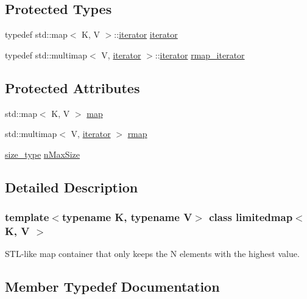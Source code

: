 \subsection*{Protected Types}
\begin{DoxyCompactItemize}
\item 
typedef std\+::map$<$ K, V $>$\+::\mbox{\hyperlink{classlimitedmap_aea661213ab6f699e9667bea25bf99821}{iterator}} \mbox{\hyperlink{classlimitedmap_aea661213ab6f699e9667bea25bf99821}{iterator}}
\item 
typedef std\+::multimap$<$ V, \mbox{\hyperlink{classlimitedmap_aea661213ab6f699e9667bea25bf99821}{iterator}} $>$\+::\mbox{\hyperlink{classlimitedmap_aea661213ab6f699e9667bea25bf99821}{iterator}} \mbox{\hyperlink{classlimitedmap_ad3d926b1f365d819073ddaed8daa4400}{rmap\+\_\+iterator}}
\end{DoxyCompactItemize}
\subsection*{Protected Attributes}
\begin{DoxyCompactItemize}
\item 
std\+::map$<$ K, V $>$ \mbox{\hyperlink{classlimitedmap_a66e668a5286b7b82061c6867548897a0}{map}}
\item 
std\+::multimap$<$ V, \mbox{\hyperlink{classlimitedmap_aea661213ab6f699e9667bea25bf99821}{iterator}} $>$ \mbox{\hyperlink{classlimitedmap_ab4a6f5b1572ee3754d53f7773b381eb2}{rmap}}
\item 
\mbox{\hyperlink{classlimitedmap_a1c564b323f94e182e56aa27975e5f9d1}{size\+\_\+type}} \mbox{\hyperlink{classlimitedmap_a3ff20a34a489085042060796d44a644e}{n\+Max\+Size}}
\end{DoxyCompactItemize}


\subsection{Detailed Description}
\subsubsection*{template$<$typename K, typename V$>$\newline
class limitedmap$<$ K, V $>$}

S\+T\+L-\/like map container that only keeps the N elements with the highest value. 

\subsection{Member Typedef Documentation}
\mbox{\label{classlimitedmap_ab0a3e4f2ec7c82359300c83a35ae2500}} 
